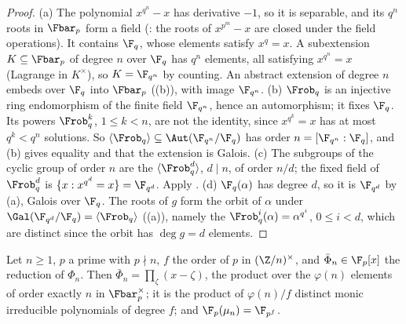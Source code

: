 \begin{proof}
(a) The polynomial $x^{q^n}-x$ has derivative $-1$, so it is separable, and its $q^n$ roots in $\Fbar_p$ form a field (: the roots of
$x^{p^m}-x$ are closed under the field operations). It contains $\F_q$, whose elements satisfy $x^q=x$. A subextension $K\subseteq\Fbar_p$ of degree $n$ over
$\F_q$ has $q^n$ elements, all satisfying $x^{q^n}=x$ (Lagrange in $K^\times$), so $K=\F_{q^n}$ by counting. An abstract extension of degree $n$ embeds over $\F_q$
into $\Fbar_p$ ((b)), with image $\F_{q^n}$.
(b) $\Frob_q$ is an injective ring endomorphism of the finite field $\F_{q^n}$, hence an automorphism; it fixes $\F_q$. Its powers $\Frob_q^k$, $1\le k<n$,
are not the identity, since $x^{q^k}=x$ has at most $q^k<q^n$ solutions. So $\langle\Frob_q\rangle\subseteq\Aut(\F_{q^n}/\F_q)$ has order $n=[\F_{q^n}:\F_q]$,
and (b) gives equality and that the extension is Galois.
(c) The subgroups of the cyclic group of order $n$ are the $\langle\Frob_q^d\rangle$, $d\mid n$, of order $n/d$; the fixed field of $\Frob_q^d$ is
$\{x:x^{q^d}=x\}=\F_{q^d}$. Apply .
(d) $\F_q(\alpha)$ has degree $d$, so it is $\F_{q^d}$ by (a), Galois over $\F_q$. The roots of $g$ form the orbit of $\alpha$ under $\Gal(\F_{q^d}/\F_q)=
\langle\Frob_q\rangle$ ((a)), namely the $\Frob_q^i(\alpha)=\alpha^{q^i}$, $0\le i<d$, which are distinct since the orbit has $\deg g=d$
elements.
\end{proof}

\begin{proposition}\label{prop:galois:cyclotomic-mod-p}
Let $n\ge1$, $p$ a prime with $p\nmid n$, $f$ the order of $p$ in $(\Z/n)^\times$, and $\bar\Phi_n\in\F_p[x]$ the reduction of $\Phi_n$. Then
$\bar\Phi_n=\prod_\zeta(x-\zeta)$, the product over the $\varphi(n)$ elements of order exactly $n$ in $\Fbar_p^\times$; it is the product of $\varphi(n)/f$ distinct
monic irreducible polynomials of degree $f$; and $\F_p(\mu_n)=\F_{p^f}$.
\end{proposition}

